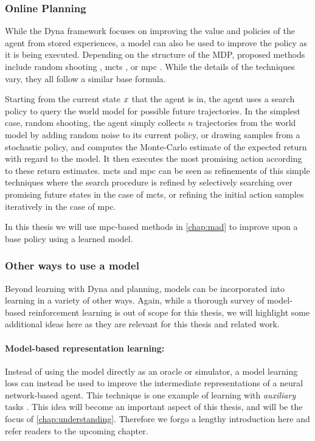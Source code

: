 \subsubsection{Online Planning}

While the Dyna framework focuses on improving the value and policies of the agent from stored experiences, a model can also be used to improve the policy as it is being executed.
Depending on the structure of the MDP, proposed methods include random shooting \parencite{pets}, \ac{mcts} \parencite{silver2016mastering,schrittwieser2020mastering}, or \ac{mpc} \parencite{hansen2022temporal,hansen2024tdmpc}.
While the details of the techniques vary, they all follow a similar base formula.

Starting from the current state $x$ that the agent is in, the agent uses a search policy to query the world model for possible future trajectories.
In the simplest case, random shooting, the agent simply collects $n$ trajectories from the world model by adding random noise to its current policy, or drawing samples from a stochastic policy, and computes the Monte-Carlo estimate of the expected return with regard to the model.
It then executes the most promising action according to these return estimates.
\ac{mcts} and \ac{mpc} can be seen as refinements of this simple techniques where the search procedure is refined by selectively searching over promising future states in the case of \ac{mcts}, or refining the initial action samples iteratively in the case of \ac{mpc}.

In this thesis we will use \ac{mpc}-based methods in \autoref{chap:mad} to improve upon a base policy using a learned model.

\subsubsection{Other ways to use a model}

Beyond learning with Dyna and planning, models can be incorporated into learning in a variety of other ways.
Again, while a thorough survey of model-based reinforcement learning is out of scope for this thesis, we will highlight some additional ideas here as they are relevant for this thesis and related work.

\paragraph{Model-based representation learning:} Instead of using the model directly as an oracle or simulator, a model learning loss can instead be used to improve the intermediate representations of a neural network-based agent.
This technique is one example of learning with \emph{auxiliary} tasks \parencite{jaderberg2017reinforcement}.
This idea will become an important aspect of this thesis, and will be the focus of \autoref{chap:understanding}.
Therefore we forgo a lengthy introduction here and refer readers to the upcoming chapter.


